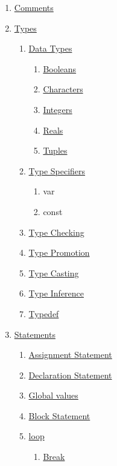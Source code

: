 \documentclass{article}
\begin{document}
  \begin{enumerate}[label*=\arabic*]
    \item \hyperref[sec:comments]{Comments}
    \item \hyperref[sec:types]{Types}
    \begin{enumerate}[label*=.\arabic*]
      \item \hyperref[sec:types]{Data Types}
      \begin{enumerate}[label*=.\arabic*]
        \item \hyperref[ssec:boolean]{Booleans}
        \item \hyperref[ssec:character]{Characters}
        \item \hyperref[ssec:integer]{Integers}
        \item \hyperref[ssec:real]{Reals}
        \item \hyperref[sec:tuple]{Tuples}
      \end{enumerate}
      \item \hyperref[sec:typeSpecifiers]{Type Specifiers}
      \begin{enumerate}[label*=.\arabic*]
        \item var
        \item const
      \end{enumerate}
      \item \hyperref[sec:typeChecking]{Type Checking}
      \item \hyperref[sec:typePromotion]{Type Promotion}
      \item \hyperref[sec:typeCasting]{Type Casting}
      \item \hyperref[sec:typeInference]{Type Inference}
      \item \hyperref[sec:typedef]{Typedef}
    \end{enumerate}
    \item \hyperref[sec:statements]{Statements}
    \begin{enumerate}[label*=.\arabic*]
      \item \hyperref[sec:assignment]{Assignment Statement}
      \item \hyperref[sec:declaration]{Declaration Statement}
      \item \hyperref[sec:global]{Global values}
      \item \hyperref[sec:block]{Block Statement}
      \item \hyperref[sec:loop]{loop}
      \begin{enumerate}[label*=.\arabic*]
        \item \hyperref[sec:break]{Break}

\end{enumerate}
\end{enumerate}
\end{enumerate}
\end{document}
